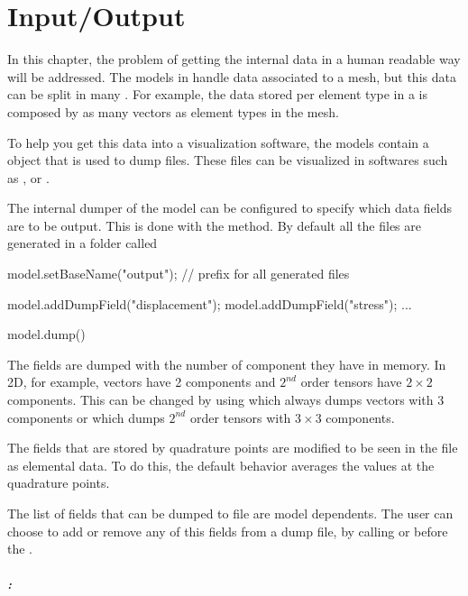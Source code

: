 \chapter{Input/Output}

In this chapter, the problem of getting the internal data in a human readable way
will be addressed. The models in \akantu handle data associated to a
mesh, but this data can be split in many . For example, the
data stored per element type in a  is composed by as
many vectors as element types in the mesh.

To help you get this data into a visualization software, the models contain a
object that is used to dump  files. These files can be visualized in softwares such
as \cite{paraview}, \cite{visit} or \cite{mayavi}.

The internal dumper of the model can be configured to specify which data fields
are to be output. This is done with the
 method. By default all the files
are generated in a folder called 

\begin{cpp}
  model.setBaseName("output"); // prefix for all generated files

  model.addDumpField("displacement");
  model.addDumpField("stress");
  ...

  model.dump()
\end{cpp}

The fields are dumped with the number of component they have in memory. In 2D, for
example, vectors have 2 components and $2^{nd}$ order tensors have $2\times2$
components.  This can be changed by using
 which always dumps
vectors with 3 components or
 which dumps $2^{nd}$
order tensors with $3\times3$ components.

The fields that are stored by quadrature points are modified to be seen in the
 file as elemental data. To do this, the default behavior averages the
values at the quadrature points.

The list of fields that can be dumped to file are model dependents. The user can
choose to add or remove any of this fields from a dump file, by calling
 or  before the .

\paragraph{:}\hfill
\vspace*{0.2cm}


